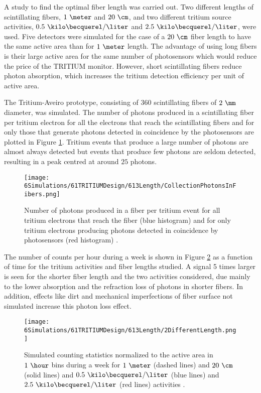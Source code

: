 A study to find the optimal fiber length was carried out. Two different lengths of scintillating fibers, $1~\meter$ and $20~\cm$, and two different tritium source activities, $0.5~\kilo\becquerel/\liter$ and $2.5~\kilo\becquerel/\liter$, were used. Five detectors were simulated for the case of a $20~\cm$ fiber length to have the same active area than for $1~\meter$ length. The advantage of using long fibers is their large active area for the same number of photosensors which would reduce the price of the TRITIUM monitor. However, short scintillating fibers reduce photon absorption, which increases the tritium detection efficiency per unit of active area. 

The Tritium-Aveiro prototype, consisting of $360$ scintillating fibers of $2~\mm$ diameter, was simulated. The number of photons produced in a scintillating fiber per tritium electron for all the electrons that reach the scintillating fibers and for only those that generate photons detected in coincidence by the photosensors are plotted in Figure \ref{fig:PhotonsFibersYesNoPhotosensors}. Tritium events that produce a large number of photons are almost always detected but events that produce few photons are seldom detected, resulting in a peak centred at around $25$ photons.  
\begin{figure}[h]
\centering
\texttt{[image: 6Simulations/61TRITIUMDesign/613Length/CollectionPhotonsInFibers.png]}
\caption{Number of photons produced in a fiber per tritium event for all tritium electrons that reach the fiber (blue histogram) and for only tritium electrons producing photons detected in coincidence by photosensors (red histogram) \cite{SimulationPaperCarlos}.\label{fig:PhotonsFibersYesNoPhotosensors}}
\end{figure}
The number of counts per hour during a week is shown in Figure \ref{fig:CountsOver60minDifferentLength} as a function of time for the tritium activities and fiber lengths studied. A signal 5 times larger is seen for the shorter fiber length and the two activities considered, due mainly to the lower absorption and the refraction loss of photons in shorter fibers. In addition, effects like dirt and mechanical imperfections of fiber surface not simulated increase this photon loss effect.

\begin{figure}[h]
\centering
\texttt{[image: 6Simulations/61TRITIUMDesign/613Length/2DifferentLength.png]}
\caption{Simulated counting statistics normalized to the active area in $1~\hour$ bins during a week for $1~\meter$ (dashed lines) and $20~\cm$ (solid lines) and $0.5~\kilo\becquerel/\liter$ (blue lines) and $2.5~\kilo\becquerel/\liter$ (red lines) activities \cite{SimulationPaperCarlos}. \label{fig:CountsOver60minDifferentLength}}
\end{figure}

